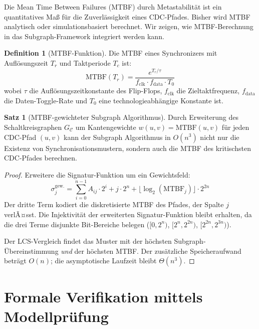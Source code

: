﻿\documentclass[a4paper,12pt]{article}
\theoremstyle{definition}
\newtheorem{definition}{Definition}
\newtheorem{satz}{Satz}
\begin{document}
	Die Mean Time Between Failures (MTBF) durch Metastabilit\"at ist
	ein quantitatives Ma\ss{} f\"ur die Zuverl\"assigkeit eines CDC-Pfades.
	Bisher wird MTBF analytisch oder simulationsbasiert berechnet.
	Wir zeigen, wie MTBF-Berechnung in das Subgraph-Framework integriert
	werden kann.
	
	\begin{definition}[MTBF-Funktion]
		Die MTBF eines Synchronizers mit Aufl\"osungszeit $T_r$ und
		Taktperiode $T_c$ ist:
		\[
		\mathrm{MTBF}(T_r) = \frac{e^{T_r / \tau}}{f_{\mathrm{clk}} \cdot f_{\mathrm{data}} \cdot T_0}
		\]
		wobei $\tau$ die Aufl\"osungszeitkonstante des Flip-Flops,
		$f_{\mathrm{clk}}$ die Zieltaktfrequenz, $f_{\mathrm{data}}$ die
		Daten-Toggle-Rate und $T_0$ eine technologieabh\"angige Konstante ist.
	\end{definition}
	
	\begin{satz}[MTBF-gewichteter Subgraph Algorithmus]
		\label{satz:mtbf}
		Durch Erweiterung des Schaltkreisgraphen $G_{\mathcal{C}}$ um
		Kantengewichte $w(u,v) = \mathrm{MTBF}(u, v)$ f\"ur jeden CDC-Pfad $(u,v)$
		kann der Subgraph Algorithmus in $O(n^3)$ nicht nur die Existenz von
		Synchronisationsmustern, sondern auch die MTBF des kritischsten
		CDC-Pfades berechnen.
	\end{satz}
	
	\begin{proof}
		Erweitere die Signatur-Funktion um ein Gewichtsfeld:
		\[
		\sigma_j^{\mathrm{gew.}} = \sum_{i=0}^{n-1} A_{ij} \cdot 2^i + j \cdot 2^n
		+ \lfloor \log_2(\mathrm{MTBF}_j) \rfloor \cdot 2^{2n}
		\]
		Der dritte Term kodiert die diskretisierte MTBF des Pfades, der
		Spalte $j$ verlÃ¤sst. Die Injektivit\"at der erweiterten Signatur-Funktion
		bleibt erhalten, da die drei Terme disjunkte Bit-Bereiche belegen
		($[0, 2^n)$, $[2^n, 2^{2n})$, $[2^{2n}, 2^{3n})$).
		
		Der LCS-Vergleich findet das Muster mit der h\"ochsten Subgraph-\"Ubereinstimmung
		\emph{und} der h\"ochsten MTBF. Der zus\"atzliche Speicheraufwand betr\"agt
		$O(n)$; die asymptotische Laufzeit bleibt $\Theta(n^3)$. \qedhere
	\end{proof}
	
	\section{Formale Verifikation mittels Modellpr\"ufung}
	
\end{document}
